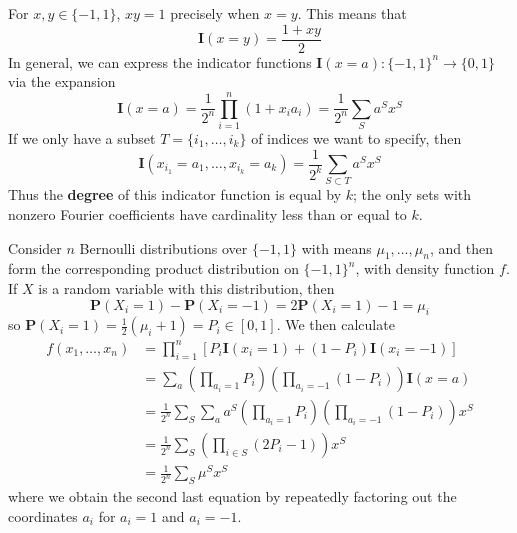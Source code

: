 \begin{example}
    For $x,y \in \{ -1, 1 \}$, $xy = 1$ precisely when $x = y$. This means that
    \[ \mathbf{I}(x = y) = \frac{1 + xy}{2} \]
    In general, we can express the indicator functions $\mathbf{I}(x = a): \{ -1, 1 \}^n \to \{ 0, 1 \}$ via the expansion
    \[ \mathbf{I}(x = a) = \frac{1}{2^n} \prod_{i = 1}^n \left( 1 + x_i a_i \right) = \frac{1}{2^n} \sum_S a^S x^S \]
    If we only have a subset $T = \{ i_1, \dots, i_k \}$ of indices we want to specify, then
    \[ \mathbf{I}(x_{i_1} = a_1, \dots, x_{i_k} = a_k) = \frac{1}{2^k} \sum_{S \subset T} a^S x^S \]
    Thus the {\bf degree} of this indicator function is equal by $k$; the only sets  with nonzero Fourier coefficients have cardinality less than or equal to $k$.
\end{example}

\begin{example}
    Consider $n$ Bernoulli distributions over $\{ -1, 1 \}$ with means $\mu_1, \dots, \mu_n$, and then form the corresponding product distribution on $\{ -1, 1 \}^n$, with density function $f$. If $X$ is a random variable with this distribution, then
    \[ \mathbf{P}(X_i = 1) - \mathbf{P}(X_i = -1) = 2 \mathbf{P}(X_i = 1) - 1 = \mu_i \]
    so $\mathbf{P}(X_i = 1) = \frac{1}{2} (\mu_i + 1) = P_i \in [0,1]$. We then calculate
    \begin{align*}
        f(x_1, \dots, x_n) &= \prod_{i = 1}^n \left[ P_i \mathbf{I}(x_i = 1) + (1 - P_i) \mathbf{I}(x_i = -1) \right]\\
        &= \sum_a \left( \prod_{a_i = 1} P_i \right) \left( \prod_{a_i = -1} (1 - P_i) \right) \mathbf{I}(x = a)\\
        &= \frac{1}{2^n} \sum_S \sum_a a^S \left( \prod_{a_i = 1} P_i \right) \left( \prod_{a_i = -1} (1 - P_i) \right) x^S\\
        &= \frac{1}{2^n} \sum_S \left( \prod_{i \in S} (2P_i - 1) \right) x^S\\
        &= \frac{1}{2^n} \sum_S \mu^S x^S
    \end{align*}
    where we obtain the second last equation by repeatedly factoring out the coordinates $a_i$ for $a_i = 1$ and $a_i = -1$.
\end{example}

